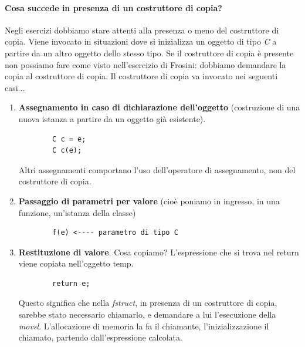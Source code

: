 \paragraph{Cosa succede in presenza di un costruttore di copia?} Negli esercizi dobbiamo stare attenti alla presenza o meno del costruttore di copia. Viene invocato in situazioni dove si inizializza un oggetto di tipo \emph{C} a partire da un altro oggetto dello stesso tipo. Se il costruttore di copia è presente non possiamo fare come visto nell'esercizio di Frosini: dobbiamo demandare la copia al costruttore di copia. Il costruttore di copia va invocato nei seguenti casi...
\begin{enumerate}
	\item \textbf{Assegnamento in caso di dichiarazione dell'oggetto} (costruzione di una nuova istanza a partire da un oggetto già esistente). 
	\begin{verbatim}
		C c = e;
		C c(e);
	\end{verbatim}
	Altri assegnamenti comportano l'uso dell'operatore di assegnamento, non del costruttore di copia.
	\item \textbf{Passaggio di parametri per valore} (cioè poniamo in ingresso, in una funzione, un'istanza della classe)
	\begin{verbatim}
		f(e) <---- parametro di tipo C
	\end{verbatim}
	\item \textbf{Restituzione di valore}. Cosa copiamo? L'espressione che si trova nel return viene copiata nell'oggetto temp. 
	\begin{verbatim}
		return e;
	\end{verbatim}
	Questo significa che nella \emph{fstruct}, in presenza di un costruttore di copia, sarebbe stato necessario chiamarlo, e demandare a lui l'esecuzione della \emph{movsl}. L'allocazione di memoria la fa il chiamante, l'inizializzazione il chiamato, partendo dall'espressione calcolata.
\end{enumerate}

